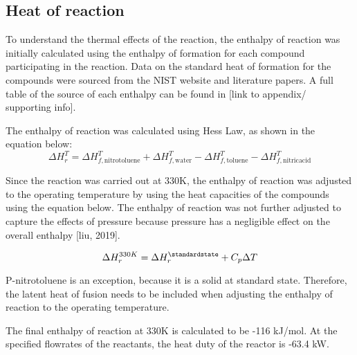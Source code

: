 \subsection{Heat of reaction}
To understand the thermal effects of the reaction, the enthalpy of reaction was initially calculated using the enthalpy of formation for each compound participating in the reaction. Data on the standard heat of formation for the compounds were sourced from the NIST website and literature papers. A full table of the source of each enthalpy can be found in [link to appendix/ supporting info]. 

The enthalpy of reaction was calculated using Hess Law, as shown in the equation below:
\begin{equation}
  \Delta H_{r}^{T} = \Delta H_{f,\mathrm{nitrotoluene}}^{T} + \Delta H_{f,\mathrm{water}}^{T} - \Delta H_{f,\mathrm{toluene}}^{T} - \Delta H_{f,\mathrm{nitric acid}}^{T}
\end{equation}

Since the reaction was carried out at 330K, the enthalpy of reaction was adjusted to the operating temperature by using the heat capacities of the compounds using the equation below. The enthalpy of reaction was not further adjusted to capture the effects of pressure because pressure has a negligible effect on the overall enthalpy [liu, 2019]. 

\begin{equation}
  \Delta H_{r}^{330K} = \Delta H_{r}^{\standardstate} + C_p \Delta T
\end{equation}

P-nitrotoluene is an exception, because it is a solid at standard state. Therefore, the latent heat of fusion needs to be included when adjusting the enthalpy of reaction to the operating temperature. 

The final enthalpy of reaction at 330K is calculated to be -116 kJ/mol. At the specified flowrates of the reactants, the heat duty of the reactor is -63.4 kW.

